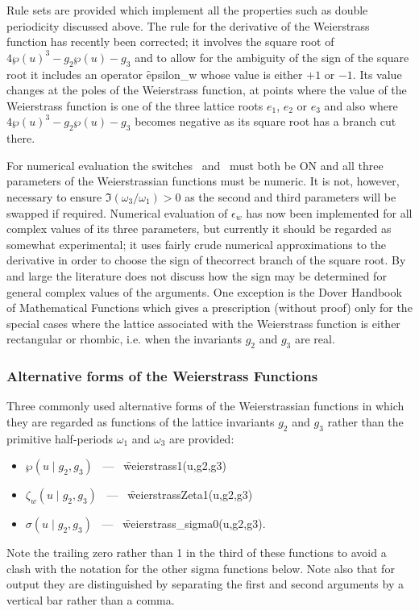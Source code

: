 Rule sets are provided which implement all the properties such as double periodicity
discussed above. The rule for the derivative of the Weierstrass function has recently
been corrected; it involves the square root of  $4\wp(u)^3-g_2\wp(u)-g_3$ and to allow
for the ambiguity of the sign of the square root it includes an operator \f{epsilon\_w}
whose value is either $+1$ or $-1$. Its value changes at the poles of the Weierstrass
function, at points where the value of the Weierstrass function is one of the three lattice
roots $e_1$, $e_2$ or $e_3$ and also where $4\wp(u)^3-g_2\wp(u)-g_3$ becomes negative
as its square root has a branch cut there.

For numerical evaluation the switches \ and \ must both
be ON and all three parameters of the Weierstrassian functions must be numeric.
It is not, however, necessary to ensure $\Im(\omega_3/\omega_1) >0$ as
the second and third parameters will be swapped if required.
Numerical evaluation of $\epsilon_{w}$ has now been implemented for all complex
values of its three parameters, but currently it should be regarded as somewhat
experimental; it uses fairly crude numerical approximations to the derivative
in order to choose the sign of thecorrect branch of the square root.  By and large
the literature does not discuss how the sign may be determined for general complex values
of the arguments. One exception is the Dover Handbook of Mathematical
Functions\cite{AbramowitzStegun:72} which gives a prescription (without proof)
only for the special cases where the lattice associated with the Weierstrass
function is either rectangular or rhombic, i.e. when the invariants $g_2$ and
$g_3$ are real.

\subsubsection{Alternative forms of the Weierstrass Functions}
\hypertarget{WEIERSTRASS1}{}
\hypertarget{WEIERSTRASSZETA1}{}
\hypertarget{WEIERSTRASS_SIGMA0}{}
\hypertarget{operator:WEIERSTRASS1}{}
\hypertarget{operator:WEIERSTRASSZETA1}{}
\hypertarget{operator:WEIERSTRASS_SIGMA0}{}
Three commonly used alternative forms of the Weierstrassian functions in which
they are regarded as functions of the lattice invariants $g_2$ and $g_3$
rather than the primitive half-periods $\omega_1$ and $\omega_3$ are provided:
\begin{itemize}
\item  $\wp(u \mid g_2, g_3)$ \ --- \ \f{weierstrass1(u,g2,g3)}
\item $\zeta_w(u \mid g_2, g_3)$ \ --- \ \f{weierstrassZeta1(u,g2,g3)}
\item $\sigma(u \mid g_2, g_3)$ \ --- \ \f{weierstrass\_sigma0(u,g2,g3)}.
\end{itemize}
Note the trailing zero rather than 1 in the third of these functions to avoid a
clash with the notation for the other sigma functions below.
Note also that for output they are distinguished by separating the first and
second arguments by a vertical bar rather than a comma.

